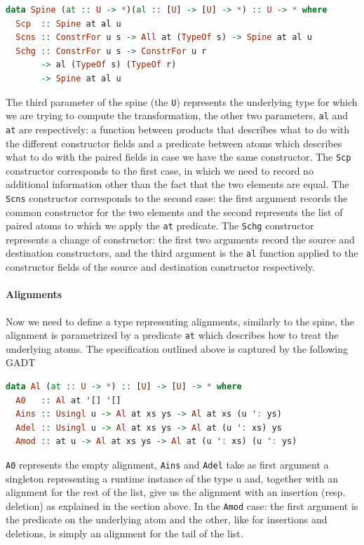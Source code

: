 \documentclass[11pt]{article}
\begin{document}
\begin{lstlisting}[language=haskell]
data Spine (at :: U -> *)(al :: [U] -> [U] -> *) :: U -> * where
  Scp  :: Spine at al u
  Scns :: ConstrFor u s -> All at (TypeOf s) -> Spine at al u
  Schg :: ConstrFor u s -> ConstrFor u r
       -> al (TypeOf s) (TypeOf r)
       -> Spine at al u
\end{lstlisting}

The third parameter of the spine (the \texttt{U}) represents the
underlying type for which we are trying to compute the transformation,
the other two parameters, \texttt{al} and \texttt{at} are respectively: a
function between products that describes what to do with the different
constructor fields and a predicate between atoms which describes what to
do with the paired fields in case we have the same constructor. The
\texttt{Scp} constructor corresponds to the first case, in which we need
to record no additional information other than the fact that the two
elements are equal. The \texttt{Scns} constructor corresponds to the
second case: the first argument records the common constructor for the
two elements and the second represents the list of paired atoms to which
we apply the \texttt{at} predicate. The \texttt{Schg} constructor
represents a change of constructor: the first two arguments record the
source and destination constructors, and the third argument is the
\texttt{al} function applied to the constructor fields of the source and
destination constructor respectively.

\paragraph{Alignments}\label{alignments}

Now we need to define a type representing alignments, similarly to the
spine, the alignment is parametrized by a predicate \texttt{at} which
describes how to treat the underlying atoms. The specification outlined
above is captured by the following GADT

\begin{lstlisting}[language=haskell]
data Al (at :: U -> *) :: [U] -> [U] -> * where
  A0   :: Al at '[] '[]
  Ains :: Usingl u -> Al at xs ys -> Al at xs (u ': ys)
  Adel :: Usingl u -> Al at xs ys -> Al at (u ': xs) ys
  Amod :: at u -> Al at xs ys -> Al at (u ': xs) (u ': ys)
\end{lstlisting}

\texttt{A0} represents the empty alignment, \texttt{Ains} and \texttt{Adel} take as first argument
a singleton representing a runtime instance of the type u and, together
with an alignment for the rest of the list, give us the alignment with
an insertion (resp. deletion) as explained in the section above. In the
\texttt{Amod} case: the first argument is the predicate on the underlying atom
and the other, like for insertions and deletions, is simply an alignment for the tail of the 
list.
\end{document}
